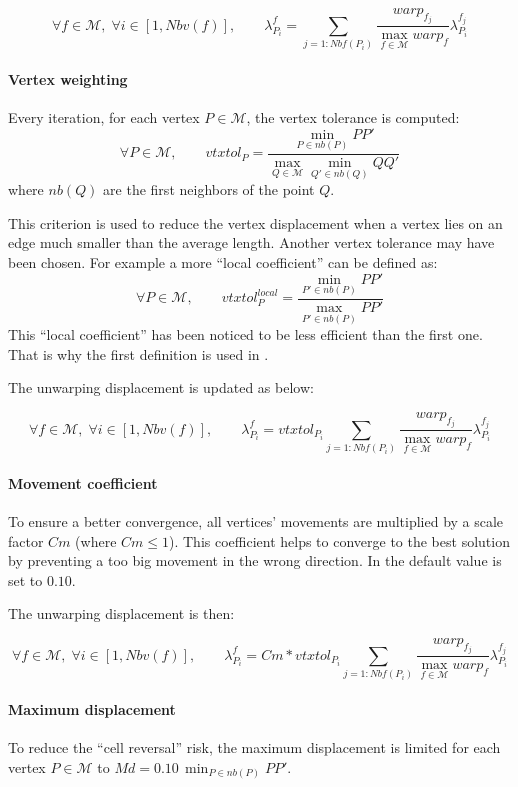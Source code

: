 $$\forall f \in \mathcal{M}, \; \forall i \in [1,Nbv(f)], \qquad
\lambda_{P_{i}}^{f}=\sum_{j=1:Nbf(P_{i})}
\frac{warp_{f_{j}}}{\max_{f \in \mathcal{M}} warp_{f}}\lambda^{f_{j}}_{P_{i}}$$

\paragraph*{Vertex weighting}
Every iteration, for each vertex $P \in \mathcal{M} $,
the vertex tolerance is computed:
$$\forall P \in \mathcal{M}, \qquad
vtxtol_{P} = \frac{\min_{P \in nb(P)} PP\prime}
{\max_{Q\in \mathcal{M}}{\min_{Q\prime\in nb(Q)} QQ\prime}}$$
where $nb(Q)$ are the first neighbors of the point $Q$.

This criterion is used to reduce the vertex displacement when a vertex lies
on an edge much smaller than the average length. Another vertex tolerance
may have been chosen. For example a more ``local coefficient'' can be
defined as:
$$\forall P \in \mathcal{M}, \qquad
vtxtol_{P}^{local} = \frac{\min_{P\prime \in nb(P)} PP\prime}
{\max_{P\prime \in nb(P)} PP\prime}$$
This ``local coefficient'' has been noticed to be less efficient than the first one.
That is why the first definition is used in \CS.

The unwarping displacement is updated as below:

$$\forall f \in \mathcal{M}, \; \forall i \in [1,Nbv(f)], \qquad
\lambda_{P_{i}}^{f}=vtxtol_{P_{i}}\sum_{j=1:Nbf(P_{i})}
\frac{warp_{f_{j}}}{\max_{f \in \mathcal{M}} warp_{f}}\lambda^{f_{j}}_{P_{i}}$$

\paragraph*{Movement coefficient}
To ensure a better convergence, all vertices' movements are multiplied by a scale
factor $Cm$ (where $Cm \leqslant 1$). This coefficient helps to converge to the
best solution by preventing a too big movement in the wrong direction.
In \CS the default value is set to $0.10$.

The unwarping displacement is then:

$$\forall f \in \mathcal{M}, \; \forall i \in [1,Nbv(f)], \qquad
\lambda_{P_{i}}^{f}=Cm*vtxtol_{P_{i}}\sum_{j=1:Nbf(P_{i})}
\frac{warp_{f_{j}}}{\max_{f \in \mathcal{M}} warp_{f}}\lambda^{f_{j}}_{P_{i}}$$

\paragraph*{Maximum displacement}
To reduce the ``cell reversal'' risk, the maximum displacement is limited for
each vertex $P \in \mathcal{M}$ to $Md = 0.10\,\min_{P \in nb(P)} PP\prime$.

